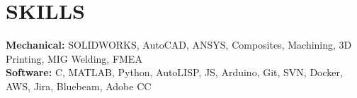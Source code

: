 \documentclass[11pt]{article}       %
\begin{document}
\section*{SKILLS}
\textbf{Mechanical:} SOLIDWORKS, AutoCAD, ANSYS, Composites, Machining, 3D Printing, MIG Welding, FMEA\\
\textbf{Software:} C, MATLAB, Python, AutoLISP, JS, Arduino, Git, SVN, Docker, AWS, Jira, Bluebeam, Adobe CC

\end{document}
